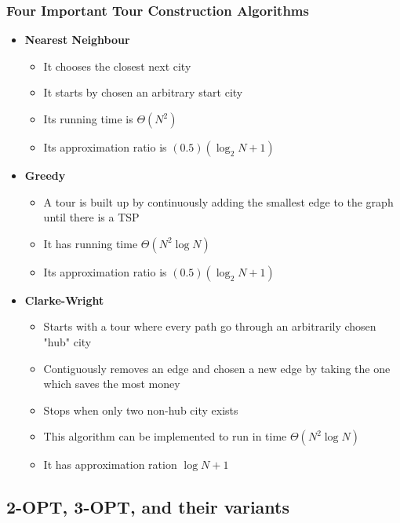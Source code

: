 \documentclass[11pt]{article}
\begin{document}
\subsubsection{Four Important Tour Construction Algorithms}
\label{sec:orgfb72a77}
\begin{itemize}
\item \textbf{Nearest Neighbour}
\begin{itemize}
\item It chooses the closest next city
\item It starts by chosen an arbitrary start city
\item Its running time is \(\Theta(N^2)\)
\item Its approximation ratio is \((0.5)(\log_2N + 1)\)
\end{itemize}

\item \textbf{Greedy}
\begin{itemize}
\item A tour is built up by continuously adding the smallest edge to the graph until there is a TSP
\item It has running time \(\Theta(N^2 \log N)\)
\item Its approximation ratio is \((0.5)(\log_2N + 1)\)
\end{itemize}

\item \textbf{Clarke-Wright}
\begin{itemize}
\item Starts with a tour where every path go through an arbitrarily chosen "hub" city
\item Contiguously removes an edge and chosen a new edge by taking the one which saves the most money
\item Stops when only two non-hub city exists
\item This algorithm can be implemented to run in time \(\Theta (N^2 \log N)\)
\item It has approximation ration \(\log N + 1\)
\end{itemize}
\end{itemize}

\subsection{2-OPT, 3-OPT, and their variants}
\label{sec:orgb27fb3a}
\end{document}
